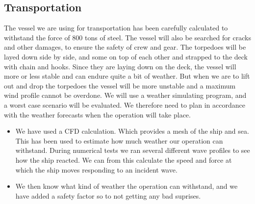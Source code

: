 \documentclass[DIV=calc, paper=a4, fontsize=13pt, twocolumn]{scrartcl}	 %
\begin{document}
\subsection*{Transportation}
The vessel we are using for transportation has been carefully calculated to withstand the force of 800 tons of steel. The vessel will also be searched for cracks and other damages, to ensure the safety of crew and gear. The torpedoes will be layed down side by side, and some on top of each other and strapped to the deck with chain and hooks. Since they are laying down on the deck, the vessel will more or less stable and can endure quite a bit of weather. But when we are to lift out and drop the torpedoes the vessel will be more unstable and a maximum wind profile cannot be overdone. We will use a weather simulating program, and a worst case scenario will be evaluated. We therefore need to plan in accordance with the weather forecasts when the operation will take place. 
\begin{itemize}
\item We have used a CFD calculation. Which provides a mesh of the ship and sea. This has been used to estimate how much weather our operation can withstand. During numerical tests we ran several different wave profiles to see how the ship reacted. We can from this calculate the speed and force at which the ship moves responding to an incident wave.
\item We then know what kind of weather the operation can withstand, and we have added a safety factor so to not getting any bad suprises.
\end{itemize}
\end{document}
